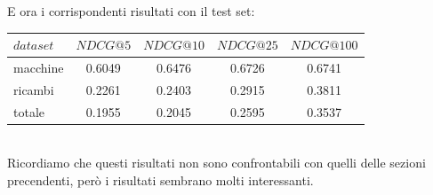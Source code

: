 E ora i corrispondenti risultati con il test set:\\

\begin{tabular}{|l|cccc|}
    \toprule
    $dataset$  &  $NDCG@5$ & $NDCG@10$  & $NDCG@25$ & $NDCG@100$  \\
    \midrule
    macchine & 0.6049 & 0.6476 & 0.6726 & 0.6741 \\
    ricambi & 0.2261 & 0.2403 & 0.2915 & 0.3811 \\
    totale  & 0.1955 & 0.2045 & 0.2595 & 0.3537 \\
\bottomrule
\end{tabular}\\

Ricordiamo che questi risultati non sono confrontabili con quelli delle sezioni precendenti, però i risultati sembrano molti interessanti.